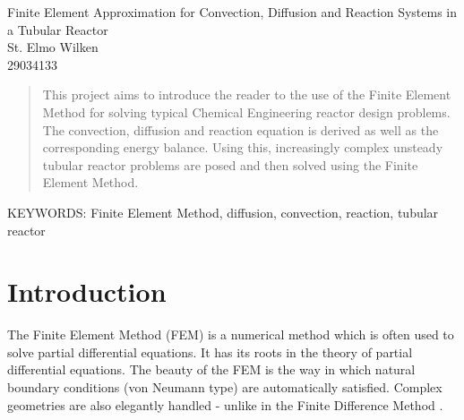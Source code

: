 \documentclass[11pt,fleqn]{article}
\theoremstyle{defstyle}
\begin{document}


\begin{center}
\Large Finite Element Approximation for Convection, Diffusion and Reaction Systems in a Tubular Reactor \\[0.5cm]
\large St. Elmo Wilken \\
29034133
\end{center}

\begin{abstract}
This project aims to introduce the reader to the use of the Finite Element Method for solving typical Chemical Engineering reactor design problems. The convection, diffusion and reaction equation is derived as well as the corresponding energy balance. Using this, increasingly complex unsteady tubular reactor problems are posed and then solved using the Finite Element Method.
\end{abstract}

\textsc{\small KEYWORDS:} \small Finite Element Method, diffusion, convection, reaction, tubular reactor
\tableofcontents
{}

\newpage
{}
\section{Introduction}
The Finite Element Method (FEM) is a numerical method which is often used to solve partial differential equations. It has its roots in the theory of partial differential equations. The beauty of the FEM is the way in which natural boundary conditions (von Neumann type) are automatically satisfied. Complex geometries are also elegantly handled - unlike in the Finite Difference Method \cite{strang}. 
\end{document}

